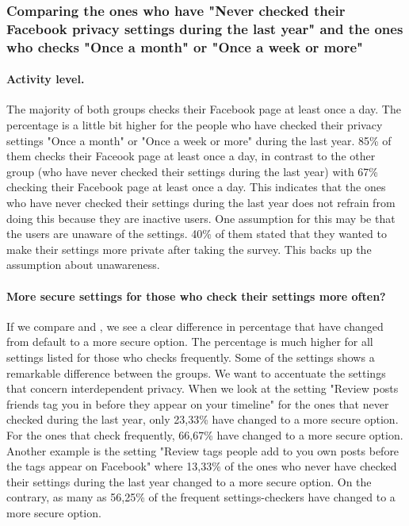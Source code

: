 \subsubsection{Comparing the ones who have "Never checked their Facebook privacy settings during the last year" and the ones who checks "Once a month" or "Once a week or more"} 

\paragraph{Activity level.}
The majority of both groups checks their Facebook page at least once a day. The percentage is a little bit higher for the people who have checked their privacy settings "Once a month" or "Once a week or more" during the last year. 85\% of them checks their Faceook page at least once a day, in contrast to the other group (who have never checked their settings during the last year) with 67\% checking their Facebook page at least once a day. This indicates that the ones who have never checked their settings during the last year does not refrain from doing this because they are inactive users. One assumption for this may be that the users are unaware of the settings. 40\% of them stated that they wanted to make their settings more private after taking the survey. This backs up the assumption about unawareness.  



\paragraph{More secure settings for those who check their settings more often?}
If we compare  and , we see a clear difference in percentage that have changed from default to a more secure option. The percentage is much higher for all settings listed for those who checks frequently. Some of the settings shows a remarkable difference between the groups. We want to accentuate the settings that concern interdependent privacy. When we look at the setting "Review posts friends tag you in before they appear on your timeline" for the ones that never checked during the last year, only 23,33\% have changed to a more secure option. For the ones that check frequently, 66,67\% have changed to a more secure option. Another example is the setting "Review tags people add to you own posts before the tags appear on Facebook" where 13,33\% of the ones who never have checked their settings during the last year changed to a more secure option. On the contrary, as many as 56,25\% of the frequent settings-checkers have changed to a more secure option.

